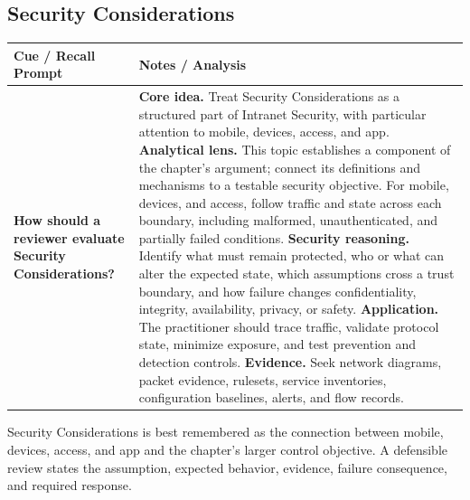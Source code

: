 \documentclass[11pt]{article}
\newcommand{\CornellHeader}{%
\rowcolor{Navy}\color{white}\bfseries Cue / Recall Prompt & \color{white}\bfseries Notes / Analysis\\\hline}
\newcommand{\CornellRow}[2]{%
\cellcolor{CueGray}\RaggedRight\textbf{#1} & \RaggedRight #2\\\hline}
\begin{document}
\subsection*{Security Considerations}
\begin{longtable}{>{\RaggedRight\arraybackslash}p{}|>{\RaggedRight\arraybackslash}p{}}
\CornellHeader
\CornellRow{How should a reviewer evaluate Security Considerations?}{\textbf{Core idea.} Treat Security Considerations as a structured part of Intranet Security, with particular attention to mobile, devices, access, and app. \textbf{Analytical lens.} This topic establishes a component of the chapter's argument; connect its definitions and mechanisms to a testable security objective. For mobile, devices, and access, follow traffic and state across each boundary, including malformed, unauthenticated, and partially failed conditions. \textbf{Security reasoning.} Identify what must remain protected, who or what can alter the expected state, which assumptions cross a trust boundary, and how failure changes confidentiality, integrity, availability, privacy, or safety. \textbf{Application.} The practitioner should trace traffic, validate protocol state, minimize exposure, and test prevention and detection controls. \textbf{Evidence.} Seek network diagrams, packet evidence, rulesets, service inventories, configuration baselines, alerts, and flow records.}
\end{longtable}
\begin{topicsummary}
Security Considerations is best remembered as the connection between mobile, devices, access, and app and the chapter's larger control objective. A defensible review states the assumption, expected behavior, evidence, failure consequence, and required response.
\end{topicsummary}
\end{document}
